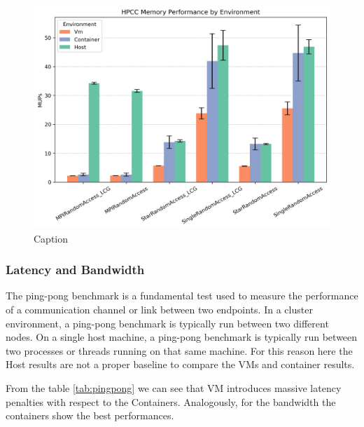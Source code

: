 \begin{figure}[H]
    \centering
    \includegraphics[width=0.8\linewidth]{assets/hpcc_memory_performance.png}
    \caption{Caption}
    \label{fig:hpcc_memory_performance}
\end{figure}

\subsubsection{Latency and Bandwidth}

The ping-pong benchmark is a fundamental test used to measure the performance of a communication channel or link between two endpoints.
In a cluster environment, a ping-pong benchmark is typically run between two different nodes. On a single host machine, a ping-pong benchmark is typically run between two processes or threads running on that same machine. For this reason here the Host results are not a proper baseline to compare the VMs and container results.

From the table \ref{tab:pingpong} we can see that VM introduces massive latency penalties with respect to the Containers. Analogously, for the bandwidth the containers show the best performances.

